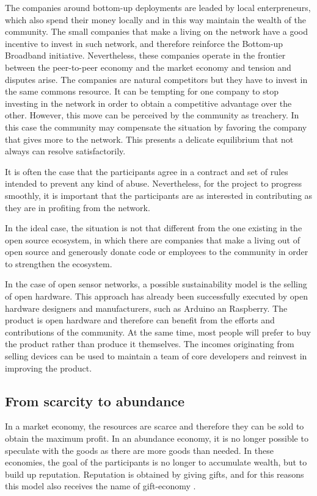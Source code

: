 \documentclass[journal]{IEEEtran}
\begin{document}
The companies around bottom-up deployments are leaded by local enterpreneurs, which also spend their money locally and in this way maintain the wealth of the community.
The small companies that make a living on the network have a good incentive to invest in such network, and therefore reinforce the Bottom-up Broadband initiative.
Nevertheless, these companies operate in the frontier between the peer-to-peer economy and the market economy and tension and disputes arise.
The companies are natural competitors but they have to invest in the same commons resource.
It can be tempting for one company to stop investing in the network in order to obtain a competitive advantage over the other.
However, this move can be perceived by the community as treachery.
In this case the community may compensate the situation by favoring the company that gives more to the network.
This presents a delicate equilibrium that not always can resolve satisfactorily.

It is often the case that the participants agree in a contract and set of rules intended to prevent any kind of abuse.
Nevertheless, for the project to progress smoothly, it is important that the participants are as interested in contributing as they are in profiting from the network.

In the ideal case, the situation is not that different from the one existing in the open source ecosystem, in which there are companies that make a living out of open source and generously donate code or employees to the community in order to strengthen the ecosystem.

In the case of open sensor networks, a possible sustainability model is the selling of open hardware.
This approach has already been successfully executed by open hardware designers and manufacturers, such as Arduino an Raspberry.
The product is open hardware and therefore can benefit from the efforts and contributions of the community.
At the same time, most people will prefer to buy the product rather than produce it themselves.
The incomes originating from selling devices can be used to maintain a team of core developers and reinvest in improving the product.


\subsection{From scarcity to abundance}

In a market economy, the resources are scarce and therefore they can be sold to obtain the maximum profit.
In an abundance economy, it is no longer possible to speculate with the goods as there are more goods than needed.
In these economies, the goal of the participants is no longer to accumulate wealth, but to build up reputation.
Reputation is obtained by giving gifts, and for this reasons this model also receives the name of gift-economy \cite{barbrook1998htg}.
\end{document}
